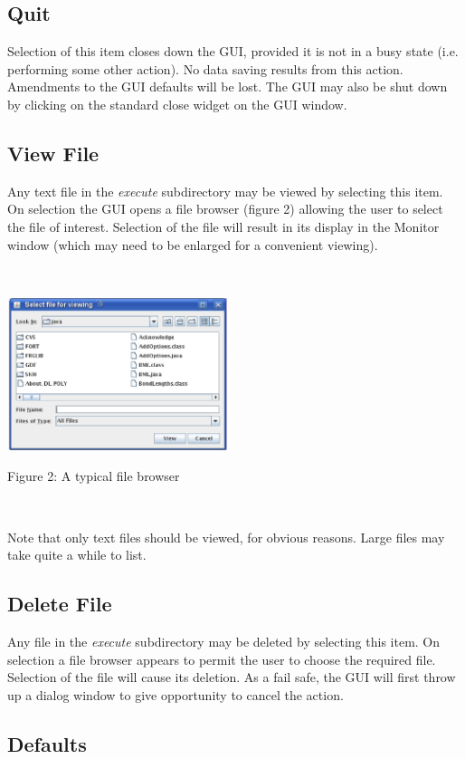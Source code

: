 \subsection{Quit}

Selection of this item closes down the GUI, provided it is not in a busy
state (i.e. performing some other action). No data saving results from
this action. Amendments to the GUI defaults will be lost. The GUI may
also be shut down by clicking on the standard close widget on the GUI
window. 

\subsection{View File}

Any text file in the {\em execute} subdirectory may be viewed by
selecting this item. On selection the GUI opens a file browser (figure
2) allowing the user to select the file of interest. Selection of the
file will result in its display in the Monitor window (which may need
to be enlarged for a convenient viewing).

~

\vskip 5mm
\centerline{\includegraphics[height=4.5cm]{browser.ps}}
\centerline{Figure 2: A typical file browser}
\vskip 5mm

~

\noindent
Note that only text files should be viewed, for obvious reasons. Large
files may take quite a while to list.

\subsection{Delete File}

Any file in the {\em execute} subdirectory may be deleted by selecting
this item. On selection a file browser appears to permit the user to
choose the required file. Selection of the file will cause its
deletion. As a fail safe, the GUI will first throw up a dialog window
to give opportunity to cancel the action.

\subsection{Defaults}

